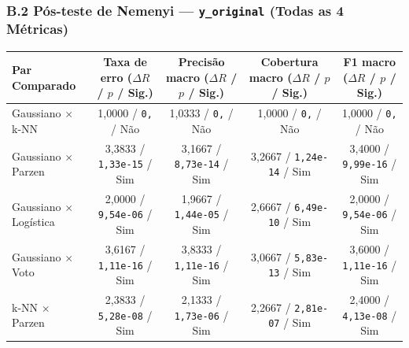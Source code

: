 \documentclass[a4paper,11pt]{article}
\begin{document}
\subsubsection*{\texorpdfstring{B.2 Pós-teste de Nemenyi --- \texttt{y\_original} (Todas as 4 Métricas)}{B.2 Pós-teste de Nemenyi - yoriginal (Todas as 4 Métricas)}}\label{sec:b-2-pos-teste-de-nemenyi-yoriginal-todas-as-4-metricas}


\begin{center}
\begin{minipage}{\linewidth}
\centering
{}
\scriptsize
\sloppy
\setlength{\tabcolsep}{2.5pt}
\renewcommand{\arraystretch}{1.18}
\begin{tabularx}{\linewidth}{P{2.6cm} C C C C}
\toprule
\textbf{Par Comparado} & \textbf{Taxa de erro ($\Delta R$ / $p$ / Sig.)} & \textbf{Precisão macro ($\Delta R$ / $p$ / Sig.)} & \textbf{Cobertura macro ($\Delta R$ / $p$ / Sig.)} & \textbf{F1 macro ($\Delta R$ / $p$ / Sig.)} \\
\midrule
Gaussiano $\times$ k-NN & 1,0000 / \texttt{0,} / Não & 1,0333 / \texttt{0,} / Não & 1,0000 / \texttt{0,} / Não & 1,0000 / \texttt{0,} / Não \\
Gaussiano $\times$ Parzen & 3,3833 / \texttt{1,\allowbreak 33e-15} / Sim & 3,1667 / \texttt{8,\allowbreak 73e-14} / Sim & 3,2667 / \texttt{1,\allowbreak 24e-14} / Sim & 3,4000 / \texttt{9,\allowbreak 99e-16} / Sim \\
Gaussiano $\times$ Logística & 2,0000 / \texttt{9,\allowbreak 54e-06} / Sim & 1,9667 / \texttt{1,\allowbreak 44e-05} / Sim & 2,6667 / \texttt{6,\allowbreak 49e-10} / Sim & 2,0000 / \texttt{9,\allowbreak 54e-06} / Sim \\
Gaussiano $\times$ Voto & 3,6167 / \texttt{1,\allowbreak 11e-16} / Sim & 3,8333 / \texttt{1,\allowbreak 11e-16} / Sim & 3,0667 / \texttt{5,\allowbreak 83e-13} / Sim & 3,6000 / \texttt{1,\allowbreak 11e-16} / Sim \\
k-NN $\times$ Parzen & 2,3833 / \texttt{5,\allowbreak 28e-08} / Sim & 2,1333 / \texttt{1,\allowbreak 73e-06} / Sim & 2,2667 / \texttt{2,\allowbreak 81e-07} / Sim & 2,4000 / \texttt{4,\allowbreak 13e-08} / Sim \\

\end{tabularx}
\end{minipage}
\end{center}
\end{document}
